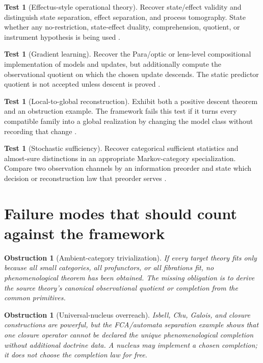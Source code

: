 \documentclass[11pt]{article}
\newtheorem{obstruction}[theorem]{Obstruction}
\theoremstyle{definition}
\newtheorem{test}[theorem]{Test}
\theoremstyle{remark}
\begin{document}
\begin{test}[Effectus-style operational theory]
Recover state/effect validity and distinguish state separation, effect separation, and process tomography. State whether any no-restriction, state-effect duality, comprehension, quotient, or instrument hypothesis is being used \cite{Effectus2015}.
\end{test}

\begin{test}[Gradient learning]
Recover the Para/optic or lens-level compositional implementation of models and updates, but additionally compute the observational quotient on which the chosen update descends. The static predictor quotient is not accepted unless descent is proved \cite{Gradient2022}.
\end{test}

\begin{test}[Local-to-global reconstruction]
Exhibit both a positive descent theorem and an obstruction example. The framework fails this test if it turns every compatible family into a global realization by changing the model class without recording that change \cite{AbramskyBrandenburger2011}.
\end{test}

\begin{test}[Stochastic sufficiency]
Recover categorical sufficient statistics and almost-sure distinctions in an appropriate Markov-category specialization. Compare two observation channels by an information preorder and state which decision or reconstruction law that preorder serves \cite{Fritz2020}.
\end{test}

\section{Failure modes that should count against the framework}

\begin{obstruction}[Ambient-category trivialization]
If every target theory fits only because all small categories, all profunctors, or all fibrations fit, no phenomenological theorem has been obtained. The missing obligation is to derive the source theory's canonical observational quotient or completion from the common primitives.
\end{obstruction}

\begin{obstruction}[Universal-nucleus overreach]
Isbell, Chu, Galois, and closure constructions are powerful, but the FCA/automata separation example shows that one closure operator cannot be declared the unique phenomenological completion without additional doctrine data. A nucleus may implement a chosen completion; it does not choose the completion law for free.
\end{obstruction}
\end{document}
